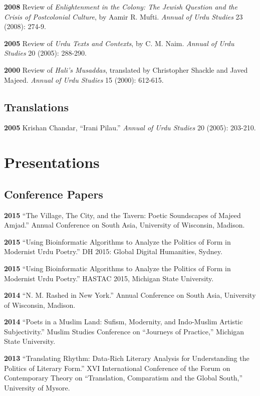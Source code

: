 \documentclass[letterpaper,12pt]{article}
\begin{document}
\textbf{2008}
Review of \emph{Enlightenment in the Colony:
The Jewish Question and the Crisis of Postcolonial Culture},
by Aamir R. Mufti.
\emph{Annual of Urdu Studies} 23 (2008): 274-9.

\textbf{2005}
Review of \emph{Urdu Texts and Contexts},
by C. M. Naim.
\emph{Annual of Urdu Studies} 20 (2005): 288-290.

\textbf{2000}
Review of \emph{Hali’s Musaddas},
translated by Christopher Shackle and Javed Majeed.
\emph{Annual of Urdu Studies} 15 (2000): 612-615.


\subsection{Translations%
  \label{translations}%
}

\textbf{2005} Krishan Chandar, “Irani Pilau.”
\emph{Annual of Urdu Studies} 20 (2005): 203-210.


\section{Presentations%
  \label{presentations}%
}


\subsection{Conference Papers%
  \label{conference-papers}%
}

\textbf{2015}
“The Village, The City, and the Tavern: Poetic Soundscapes of Majeed Amjad.”
Annual Conference on South Asia, University of Wisconsin, Madison.

\textbf{2015}
“Using Bioinformatic Algorithms to Analyze the Politics of Form in Modernist Urdu Poetry.”
DH 2015: Global Digital Humanities, Sydney.

\textbf{2015}
“Using Bioinformatic Algorithms to Analyze the Politics of Form in Modernist Urdu Poetry.”
HASTAC 2015, Michigan State University.

\textbf{2014}
“N. M. Rashed in New York.”
Annual Conference on South Asia,
University of Wisconsin, Madison.

\textbf{2014}
“Poets in a Muslim Land:
Sufism, Modernity, and Indo-Muslim Artistic Subjectivity.”
Muslim Studies Conference on “Journeys of Practice,”
Michigan State University.

\textbf{2013}
“Translating Rhythm:
Data-Rich Literary Analysis for Understanding the Politics of Literary Form.”
XVI International Conference of the Forum on Contemporary Theory on
“Translation, Comparatism and the Global South,” University of Mysore.
\end{document}
